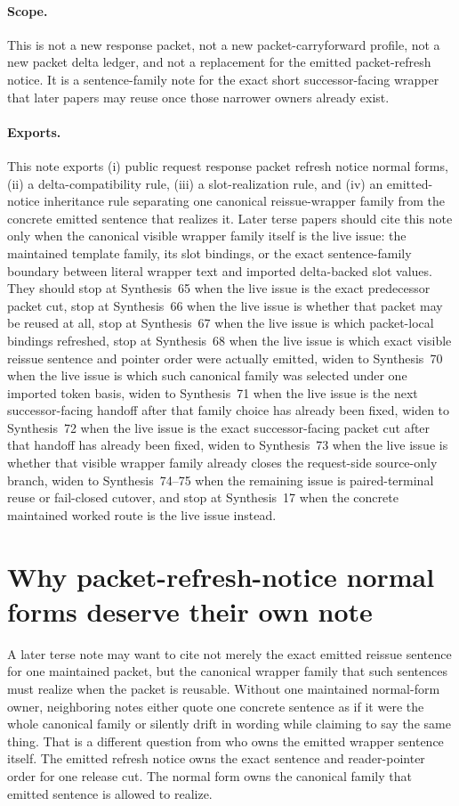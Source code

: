 \documentclass[11pt]{article}
\begin{document}
\paragraph{Scope.}
This is not a new response packet, not a new packet-carryforward profile, not a new packet delta ledger, and not a replacement for the emitted packet-refresh notice.
It is a sentence-family note for the exact short successor-facing wrapper that later papers may reuse once those narrower owners already exist.

\paragraph{Exports.}
This note exports (i) public request response packet refresh notice normal forms, (ii) a delta-compatibility rule, (iii) a slot-realization rule, and (iv) an emitted-notice inheritance rule separating one canonical reissue-wrapper family from the concrete emitted sentence that realizes it.
Later terse papers should cite this note only when the canonical visible wrapper family itself is the live issue: the maintained template family, its slot bindings, or the exact sentence-family boundary between literal wrapper text and imported delta-backed slot values. They should stop at Synthesis~65 when the live issue is the exact predecessor packet cut, stop at Synthesis~66 when the live issue is whether that packet may be reused at all, stop at Synthesis~67 when the live issue is which packet-local bindings refreshed, stop at Synthesis~68 when the live issue is which exact visible reissue sentence and pointer order were actually emitted, widen to Synthesis~70 when the live issue is which such canonical family was selected under one imported token basis, widen to Synthesis~71 when the live issue is the next successor-facing handoff after that family choice has already been fixed, widen to Synthesis~72 when the live issue is the exact successor-facing packet cut after that handoff has already been fixed, widen to Synthesis~73 when the live issue is whether that visible wrapper family already closes the request-side source-only branch, widen to Synthesis~74--75 when the remaining issue is paired-terminal reuse or fail-closed cutover, and stop at Synthesis~17 when the concrete maintained worked route is the live issue instead.

\section{Why packet-refresh-notice normal forms deserve their own note}
A later terse note may want to cite not merely the exact emitted reissue sentence for one maintained packet, but the canonical wrapper family that such sentences must realize when the packet is reusable.
Without one maintained normal-form owner, neighboring notes either quote one concrete sentence as if it were the whole canonical family or silently drift in wording while claiming to say the same thing.
That is a different question from who owns the emitted wrapper sentence itself.
The emitted refresh notice owns the exact sentence and reader-pointer order for one release cut.
The normal form owns the canonical family that emitted sentence is allowed to realize.
\end{document}
